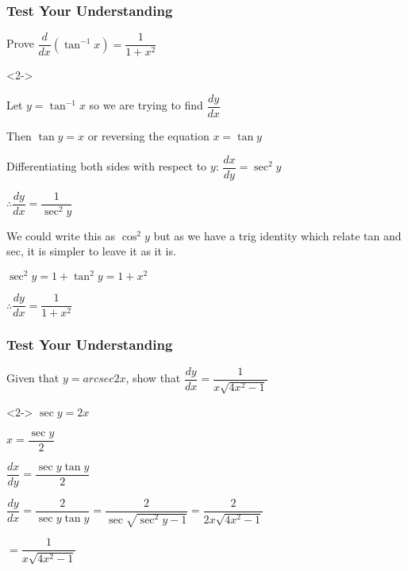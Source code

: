 \documentclass{beamer}
\begin{document}
	\begin{frame}[shrink=15]
		\frametitle{Test Your Understanding}
		\begin{problem}
			Prove $\dfrac{d}{dx}\left( \tan ^{-1}x\right) =\dfrac{1}{1+x^{2}}$
		\end{problem}
		
		\begin{solution}<2->
			
			Let $y = \tan^{-1}x$ so we are trying to find $\dfrac{dy}{dx}$ 
			
			Then $\tan y = x$ or reversing the equation $x = \tan y$
			
			Differentiating both sides with respect to $y$: $\dfrac{dx}{dy} = \sec ^{2}y$
			
			$\therefore \dfrac{dy}{dx}=\dfrac{1}{\sec ^{2}y}$    \begin{minipage}{.7\linewidth}
				\alert{\small{We could write this as $\cos ^{2}y$ but as we have a trig identity which relate tan and sec, it is simpler to leave it as it is.}}
			\end{minipage}
			
			$\sec ^{2}y=1+\tan ^{2}y = 1+x^{2}$ 
			
			$\therefore \dfrac{dy}{dx}=\dfrac{1}{1+x^{2}}$
		\end{solution}
	\end{frame}
	
	\begin{frame}
		\frametitle{Test Your Understanding}
		\begin{problem}
			Given that $y = arcsec 2x$, show that $\dfrac{dy}{dx}=\dfrac{1}{x\sqrt{4x^{2}-1}}$
		\end{problem}
		
		\begin{solution}<2->
			$\sec y=2x$
			
			$x=\dfrac{\sec y}{2}$
			
			$\dfrac{dx}{dy}=\dfrac{\sec y\tan y}{2}$
			
			$\dfrac{dy}{dx}=\dfrac{2}{\sec y\tan y}=\dfrac{2}{\sec \sqrt{\sec ^{2}y-1}}=\dfrac{2}{2x \sqrt{4x^{2}-1}}$
			
			$=\dfrac{1}{x\sqrt{4x^{2}-1}}$
		\end{solution}
	\end{frame}
	
	
	
\end{document}
